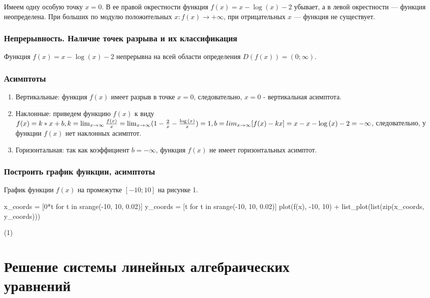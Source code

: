 \documentclass[14pt]{extreport}
\begin{document}
Имеем одну особую точку $x = 0$. В ее правой окрестности функция $f(x) = x - \log{(x)} - 2$ убывает, а в левой окрестности --- функция неопределена. При больших по модулю положительных $x: f(x)\to+\infty$, при
отрицательных $x$ --- функция не существует.

\subsubsection{Непрерывность. Наличие точек разрыва и их классификация}

Функция $f(x) = x - \log{(x)} - 2$ непрерывна на всей области определения $D(f(x)) = (0;\infty)$.

\subsubsection{Асимптоты}

\begin{enumerate}
\item Вертикальные: функция $f(x)$ имеет разрыв в точке $x = 0$, следовательно, $x = 0$ - вертикальная
асимптота.

\item Наклонные: приведем функцию $f(x)$ к виду $f(x) = k*x + b,\\
k = \lim_{x\to\infty}\frac{f(x)}{x} = \lim_{x\to\infty}(1 - \frac{2}{x} - \frac{\log{(x)}}{x}) = 1, b =
lim_{x\to\infty}[f(x) - kx] = x - x - \log{(x)} - 2 = -\infty$, следовательно, у функции $f(x)$ нет
наклонных асимптот.

\item Горизонтальная: так как коэффициент $b = -\infty$, функция $f(x)$ не имеет горизонтальных асимптот.
\end{enumerate}

\subsubsection{Построить график функции, асимптоты}

График функции $f(x)$ на промежутке $[-10;10]$ на рисунке 1.

\begin{sagesilent}
x_coords = [0*t for t in srange(-10, 10, 0.02)]
y_coords = [t for t in srange(-10, 10, 0.02)]
plot(f(x), -10, 10) + list_plot(list(zip(x_coords, y_coords)))
\end{sagesilent}
\eqn(1)

\section{Решение системы линейных алгебраических\\уравнений}
\end{document}
